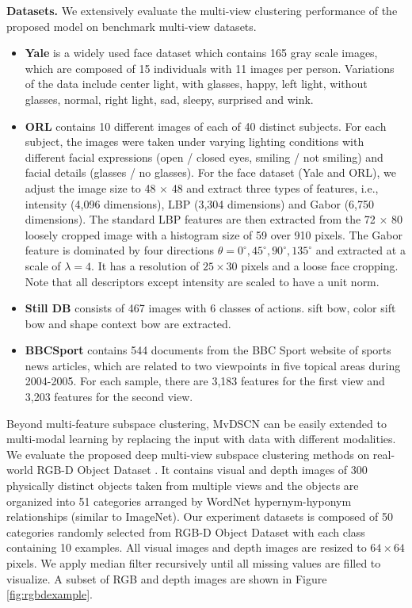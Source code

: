 \documentclass[journal]{IEEEtran}
\begin{document}
\textbf{Datasets.}
We extensively evaluate the multi-view clustering performance of the proposed model on benchmark multi-view datasets.
\begin{itemize}
  \item  {\textbf{Yale}} is a widely used face dataset which contains 165 gray scale images, which are composed of 15 individuals with 11 images per person.
Variations of the data include center light, with glasses, happy, left light, without glasses, normal, right light, sad, sleepy, surprised and wink.
  \item {\textbf{ORL}} contains 10 different images of each of 40 distinct subjects.
For each subject, the images were taken under varying lighting conditions with different facial expressions (open / closed eyes, smiling / not smiling) and facial details (glasses / no glasses).
For the face dataset (Yale and ORL),  we adjust the image size to 48 $\times$ 48 and extract three types of features, i.e., intensity (4,096 dimensions), LBP (3,304 dimensions) and Gabor (6,750 dimensions).
The standard LBP features are then extracted from the 72 $\times$  80 loosely cropped image with a histogram size of 59 over 910 pixels.
The Gabor feature is dominated by four directions $\theta = {0^\circ , 45^\circ , 90^\circ , 135^\circ }$ and extracted at a scale of $\lambda = 4$. It has a resolution of $25 \times 30$ pixels and a loose face cropping.
Note that all descriptors except intensity are scaled to have a unit norm.
  \item {\textbf{Still DB}} consists of 467 images with 6 classes of actions.
sift bow, color sift bow and shape context bow are extracted.
  \item {\textbf{BBCSport}} contains 544 documents from the BBC Sport website of sports news articles, which are related to two viewpoints in five topical areas during 2004-2005. For each sample, there are 3,183 features for the first view and 3,203 features for the second view.
\end{itemize}

Beyond multi-feature subspace clustering, MvDSCN can be easily extended to multi-modal learning by replacing the input with data with different modalities.
We evaluate the proposed deep multi-view subspace clustering methods on real-world RGB-D Object Dataset \cite{Lai2011ALH}.
It contains visual and depth images of 300 physically distinct objects taken from multiple views and the objects are organized into 51 categories arranged by WordNet hypernym-hyponym relationships (similar to ImageNet).
Our experiment datasets is composed of 50 categories randomly selected from RGB-D Object Dataset with each class containing 10 examples.
All visual images and depth images are resized to $64 \times 64$ pixels.
We apply median filter recursively until all missing values are filled to visualize.
A subset of RGB and depth images are shown in Figure \ref{fig:rgbdexample}.
\end{document}
